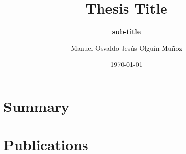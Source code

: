 \documentclass[electronic,oldfontcommands]{kthesis}
\begin{document}
\title{ Thesis Title }
\subtitle{\textbf{sub-title}}
\author{Manuel {Osvaldo Jesús} {Olguín Muñoz}}
\date{\today}
\address{%
	KTH Royal Institute of Technology\\%
	School of Electrical Engineering and Computer Science\\%
	Division of Information Science and Engineering\\%
	SE-10044 Stockholm\\%
	Sweden%
}

\maketitle

\frontmatter %






\mainmatter %

\tableofcontents*{}
\part{Summary}





\part{Publications}
\begin{appendices}
\renewcommand{\appendixname}{Paper}


\end{appendices}
\end{document}
